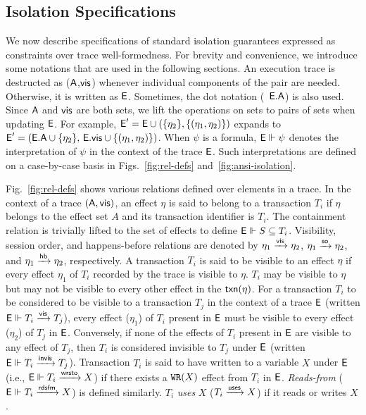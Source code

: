 \subsection{Isolation Specifications}
\label{sec:ansi-isolation}




We now describe specifications of standard isolation guarantees
expressed as constraints over trace well-formedness. For brevity and
convenience, we introduce some notations that are used in the following
sections.  An execution trace is destructed as ($\textsf{A}$,$\textsf{vis}$) whenever
individual components of the pair are needed. Otherwise, it is written
as $\textsf{E}$.  Sometimes, the dot notation (\eg~$\textsf{E}.\textsf{A}$) is also
used. Since $\textsf{A}$ and $\textsf{vis}$ are both sets, we lift the operations on
sets to pairs of sets when updating $\textsf{E}$. For example, $\textsf{E}' = \textsf{E} \cup
(\{\eta_2\},\{(\eta_1,\eta_2)\})$ expands to $\textsf{E}' = (\textsf{E}.\textsf{A} \cup
\{\eta_2\},\,\textsf{E}.\textsf{vis} \cup \{(\eta_1,\eta_2)\})$.  When $\psi$ is a
formula, $\textsf{E} \Vdash \psi$ denotes the interpretation of $\psi$ in the
context of the trace $\textsf{E}$. Such interpretations are defined on a
case-by-case basis in Figs.~\ref{fig:rel-defs}
and~\ref{fig:ansi-isolation}.

Fig.~\ref{fig:rel-defs} shows various relations defined over elements
in a trace. In the context of a trace $(\textsf{A},\textsf{vis})$, an effect $\eta$
is said to belong to a transaction $T_i$ if $\eta$ belongs to the
effect set $A$ and its transaction identifier is $T_i$. The
containment relation is trivially lifted to the set of effects to
define $\textsf{E} \Vdash S \subseteq T_i$.  Visibility, session order, and
happens-before relations are denoted by $\eta_1 \xrightarrow{\textsf{vis}} \eta_2$,
$\eta_1 \xrightarrow{\textsf{so}} \eta_2$, and $\eta_1 \xrightarrow{\textsf{hb}} \eta_2$, respectively. A
transaction $T_i$ is said to be visible to an effect $\eta$ if every
effect $\eta_1$ of $T_i$ recorded by the trace is visible to $\eta$.
$T_i$ may be visible to $\eta$ but may not be visible to every other
effect in the $\textsf{txn}(\eta)$. For a transaction $T_i$ to be considered
to be visible to a transaction $T_j$ in the context of a trace $\textsf{E}$
(written $\textsf{E} \Vdash T_i \xrightarrow{\textsf{vis}} T_j$), every effect ($\eta_1$) of $T_i$
present in $\textsf{E}$ must be visible to every effect ($\eta_2$) of $T_j$ in
$\textsf{E}$.  Conversely, if none of the effects of $T_i$ present in $\textsf{E}$ are
visible to any effect of $T_j$, then $T_i$ is considered invisible to
$T_j$ under $\textsf{E}$ (written $\textsf{E} \Vdash T_i \xrightarrow{\textsf{invis}} T_j$). Transaction
$T_i$ is said to have written to a variable $X$ under $\textsf{E}$ (i.e.,
$\textsf{E} \Vdash T_i \xrightarrow{\textsf{wrsto}} X$) if there exists a ${\tt WR}(X)$ effect from
$T_i$ in $\textsf{E}$.  \emph{Reads-from} ($\textsf{E} \Vdash T_i \xrightarrow{\textsf{rdsfm}} X$) is
defined similarly. $T_i$ \emph{uses} $X$ ($T_i \xrightarrow{\textsf{uses}} X$) if it reads
or writes $X$.

